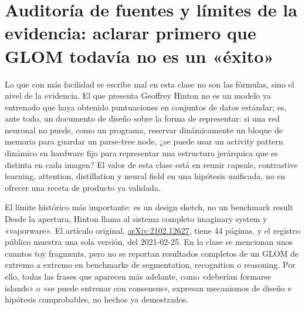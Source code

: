 \section{Auditoría de fuentes y límites de la evidencia: aclarar primero que GLOM todavía no es un «éxito»}

Lo que con más facilidad se escribe mal en esta clase no son las fórmulas, sino el nivel de la evidencia. El  que presenta Geoffrey Hinton no es un modelo ya entrenado que haya obtenido puntuaciones en conjuntos de datos estándar; es, ante todo, un documento de diseño sobre la forma de representar: si una red neuronal no puede, como un programa, reservar dinámicamente un bloque de memoria para guardar un parse-tree node, ¿se puede usar un activity pattern dinámico en hardware fijo para representar una estructura jerárquica que es distinta en cada imagen? El valor de esta clase está en reunir capsule, contrastive learning, attention, distillation y neural field en una hipótesis unificada, no en ofrecer una receta de producto ya validada.


\begin{warningbox}{El límite histórico más importante: es un design sketch, no un benchmark result}
Desde la apertura, Hinton llama al sistema completo imaginary system y «vaporware». El artículo original, \href{https://arxiv.org/abs/2102.12627}{arXiv:2102.12627}, tiene 44 páginas, y el registro público muestra una sola versión, del 2021-02-25. En la clase se mencionan unos cuantos toy fragments, pero no se reportan resultados completos de un GLOM de extremo a extremo en benchmarks de segmentation, recognition o reasoning. Por ello, todas las frases que aparecen más adelante, como «deberían formarse islands» o «se puede entrenar con consensus», expresan mecanismos de diseño e hipótesis comprobables, no hechos ya demostrados.
\end{warningbox}


